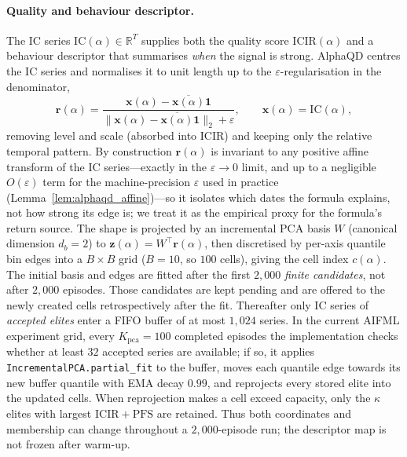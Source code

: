 \paragraph{Quality and behaviour descriptor.} The IC series $\mathrm{IC}(\alpha)\in\mathbb{R}^T$ supplies both the quality score $\mathrm{ICIR}(\alpha)$ and a behaviour descriptor that summarises \emph{when} the signal is strong. AlphaQD centres the IC series and normalises it to unit length up to the $\varepsilon$-regularisation in the denominator,
\begin{equation}
\label{eq:alphaqd_shape}
\mathbf{r}(\alpha) = \frac{\mathbf{x}(\alpha)-\overline{\mathbf{x}(\alpha)}\mathbf{1}}{\|\mathbf{x}(\alpha)-\overline{\mathbf{x}(\alpha)}\mathbf{1}\|_2+\varepsilon},
\qquad \mathbf{x}(\alpha)=\mathrm{IC}(\alpha),
\end{equation}
removing level and scale (absorbed into ICIR) and keeping only the relative temporal pattern. By construction $\mathbf{r}(\alpha)$ is invariant to any positive affine transform of the IC series---exactly in the $\varepsilon\to 0$ limit, and up to a negligible $O(\varepsilon)$ term for the machine-precision $\varepsilon$ used in practice (Lemma~\ref{lem:alphaqd_affine})---so it isolates which dates the formula explains, not how strong its edge is; we treat it as the empirical proxy for the formula's return source. The shape is projected by an incremental PCA basis $W$ (canonical dimension $d_b=2$) to $\mathbf{z}(\alpha)=W^\top\mathbf{r}(\alpha)$, then discretised by per-axis quantile bin edges into a $B\times B$ grid ($B=10$, so $100$ cells), giving the cell index $c(\alpha)$. The initial basis and edges are fitted after the first $2{,}000$ \emph{finite candidates}, not after $2{,}000$ episodes. Those candidates are kept pending and are offered to the newly created cells retrospectively after the fit. Thereafter only IC series of \emph{accepted elites} enter a FIFO buffer of at most $1{,}024$ series. In the current AIFML experiment grid, every $K_{\mathrm{pca}}=100$ completed episodes the implementation checks whether at least $32$ accepted series are available; if so, it applies \texttt{IncrementalPCA.partial\_fit} to the buffer, moves each quantile edge towards its new buffer quantile with EMA decay $0.99$, and reprojects every stored elite into the updated cells. When reprojection makes a cell exceed capacity, only the $\kappa$ elites with largest $\mathrm{ICIR}+\mathrm{PFS}$ are retained. Thus both coordinates and membership can change throughout a $2{,}000$-episode run; the descriptor map is not frozen after warm-up.

